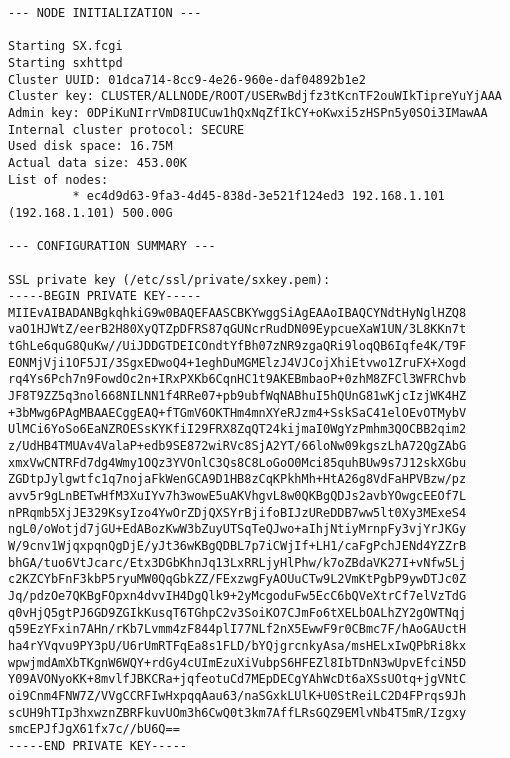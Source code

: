 \begin{lstlisting}
--- NODE INITIALIZATION ---

Starting SX.fcgi
Starting sxhttpd
Cluster UUID: 01dca714-8cc9-4e26-960e-daf04892b1e2
Cluster key: CLUSTER/ALLNODE/ROOT/USERwBdjfz3tKcnTF2ouWIkTipreYuYjAAA
Admin key: 0DPiKuNIrrVmD8IUCuw1hQxNqZfIkCY+oKwxi5zHSPn5y0SOi3IMawAA
Internal cluster protocol: SECURE
Used disk space: 16.75M
Actual data size: 453.00K
List of nodes:
         * ec4d9d63-9fa3-4d45-838d-3e521f124ed3 192.168.1.101 (192.168.1.101) 500.00G

--- CONFIGURATION SUMMARY ---

SSL private key (/etc/ssl/private/sxkey.pem):
-----BEGIN PRIVATE KEY-----
MIIEvAIBADANBgkqhkiG9w0BAQEFAASCBKYwggSiAgEAAoIBAQCYNdtHyNglHZQ8
vaO1HJWtZ/eerB2H80XyQTZpDFRS87qGUNcrRudDN09EypcueXaW1UN/3L8KKn7t
tGhLe6quG8QuKw//UiJDDGTDEICOndtYfBh07zNR9zgaQRi9loqQB6Iqfe4K/T9F
EONMjVji1OF5JI/3SgxEDwoQ4+1eghDuMGMElzJ4VJCojXhiEtvwo1ZruFX+Xogd
rq4Ys6Pch7n9FowdOc2n+IRxPXKb6CqnHC1t9AKEBmbaoP+0zhM8ZFCl3WFRChvb
JF8T9ZZ5q3nol668NILNN1f4RRe07+pb9ubfWqNABhuI5hQUnG81wKjcIzjWK4HZ
+3bMwg6PAgMBAAECggEAQ+fTGmV6OKTHm4mnXYeRJzm4+SskSaC41elOEvOTMybV
UlMCi6YoSo6EaNZROESsKYKfiI29FRX8ZqQT24kijmaI0WgYzPmhm3QOCBB2qim2
z/UdHB4TMUAv4ValaP+edb9SE872wiRVc8SjA2YT/66loNw09kgszLhA72QgZAbG
xmxVwCNTRFd7dg4Wmy1OQz3YVOnlC3Qs8C8LoGoO0Mci85quhBUw9s7J12skXGbu
ZGDtpJylgwtfc1q7nojaFkWenGCA9D1HB8zCqKPkhMh+HtA26g8VdFaHPVBzw/pz
avv5r9gLnBETwHfM3XuIYv7h3wowE5uAKVhgvL8w0QKBgQDJs2avbYOwgcEEOf7L
nPRqmb5XjJE329KsyIzo4YwOrZDjQXSYrBjifoBIJzUReDDB7ww5lt0Xy3MExeS4
ngL0/oWotjd7jGU+EdABozKwW3bZuyUTSqTeQJwo+aIhjNtiyMrnpFy3vjYrJKGy
W/9cnv1WjqxpqnQgDjE/yJt36wKBgQDBL7p7iCWjIf+LH1/caFgPchJENd4YZZrB
bhGA/tuo6VtJcarc/Etx3DGbKhnJq13LxRRLjyHlPhw/k7oZBdaVK27I+vNfw5Lj
c2KZCYbFnF3kbP5ryuMW0QqGbkZZ/FExzwgFyAOUuCTw9L2VmKtPgbP9ywDTJc0Z
Jq/pdzOe7QKBgFOpxn4dvvIH4DgQlk9+2yMcgoduFw5EcC6bQVeXtrCf7elVzTdG
q0vHjQ5gtPJ6GD9ZGIkKusqT6TGhpC2v3SoiKO7CJmFo6tXELbOALhZY2gOWTNqj
q59EzYFxin7AHn/rKb7Lvmm4zF844plI77NLf2nX5EwwF9r0CBmc7F/hAoGAUctH
ha4rYVqvu9PY3pU/U6rUmRTFqEa8s1FLD/bYQjgrcnkyAsa/msHELxIwQPbRi8kx
wpwjmdAmXbTKgnW6WQY+rdGy4cUImEzuXiVubpS6HFEZl8IbTDnN3wUpvEfciN5D
Y09AVONyoKK+8mvlfJBKCRa+jqfeotuCd7MEpDECgYAhWcDt6aXSsUOtq+jgVNtC
oi9Cnm4FNW7Z/VVgCCRFIwHxpqqAau63/naSGxkLUlK+U0StReiLC2D4FPrqs9Jh
scUH9hTIp3hxwznZBRFkuvUOm3h6CwQ0t3km7AffLRsGQZ9EMlvNb4T5mR/Izgxy
smcEPJfJgX61fx7c//bU6Q==
-----END PRIVATE KEY-----


\end{lstlisting}
